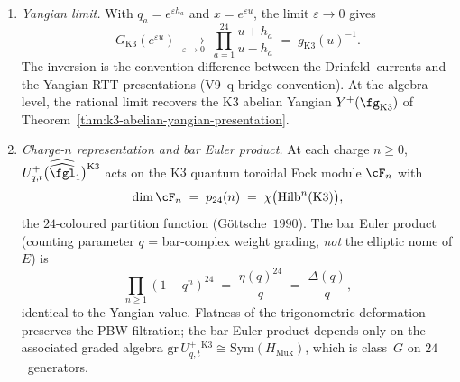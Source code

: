 \begin{theorem}
\begin{enumerate}[label=\textup{(\roman*)}]
\item \emph{Yangian limit.}
With $q_a = e^{\varepsilon h_a}$ and $x = e^{\varepsilon u}$, the limit
$\varepsilon \to 0$ gives
\[
  G_{\mathrm{K}3}(e^{\varepsilon u})
  \;\xrightarrow[\varepsilon \to 0]{}\;
  \prod_{a=1}^{24} \frac{u + h_a}{u - h_a}
  \;=\; g_{\mathrm{K}3}(u)^{-1}.
\]
The inversion is the convention difference between the Drinfeld--currents
and the Yangian RTT presentations (V9~q-bridge convention).  At the
algebra level, the rational limit recovers the K$3$ abelian Yangian
$Y^+(\fg_{\mathrm{K}3})$ of Theorem~\ref{thm:k3-abelian-yangian-presentation}.

\item \emph{Charge-$n$ representation and bar Euler product.}
At each charge $n \geq 0$, $U^+_{q,t}\bigl(\widehat{\widehat{\fgl}}_1\bigr)^{\mathrm{K}3}$
acts on the K$3$ quantum toroidal Fock module $\cF_n$ with
\[
  \dim \cF_n \;=\; p_{24}(n)
  \;=\; \chi\bigl(\mathrm{Hilb}^n(\mathrm{K}3)\bigr),
\]
the $24$-coloured partition function (G\"ottsche~$1990$).  The bar
Euler product (counting parameter $q$ = bar-complex weight grading,
\emph{not} the elliptic nome of $E$) is
\[
  \prod_{n \geq 1}(1 - q^n)^{24}
  \;=\; \frac{\eta(q)^{24}}{q}
  \;=\; \frac{\Delta(q)}{q},
\]
identical to the Yangian value.  Flatness of the trigonometric
deformation preserves the PBW filtration; the bar Euler product depends
only on the associated graded algebra
$\mathrm{gr}\, U^+_{q,t}^{\mathrm{K}3} \cong \mathrm{Sym}(H_{\mathrm{Muk}})$,
which is class~$G$ on $24$~generators.
\end{enumerate}
\end{theorem}

